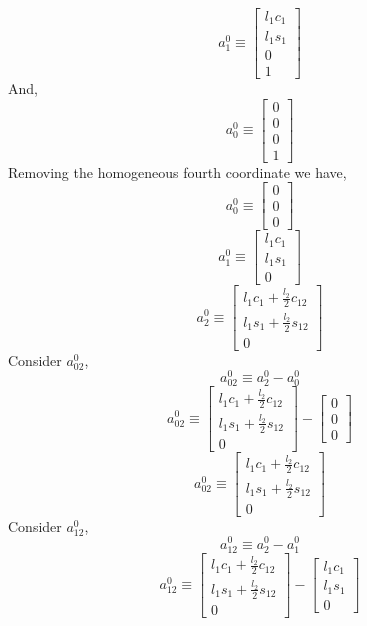 \documentclass[12pt]{article}
\begin{document}
\[
  a_1^0 \equiv
  \begin{bmatrix}
    l_1c_1\\
    l_1s_1\\
    0 \\
    1
  \end{bmatrix}
\]
And,
\[
  a_0^0 \equiv \begin{bmatrix} 0 \\ 0 \\ 0 \\ 1 \end{bmatrix}
\]
Removing the homogeneous fourth coordinate we have,
\[
  a_0^0 \equiv
  \begin{bmatrix} 0 \\ 0 \\ 0  \end{bmatrix}
\]
\[
  a_1^0 \equiv
  \begin{bmatrix}
    l_1c_1\\
    l_1s_1\\
    0
  \end{bmatrix}
\]
\[
  a_2^0 \equiv
  \begin{bmatrix}
    l_1c_1 + \frac{l_2}{2}c_{12}\\
    l_1s_1 + \frac{l_2}{2}s_{12}\\
    0
  \end{bmatrix}
\]
Consider $a_{02}^0$,
\[
  a_{02}^0 \equiv a_2^0 - a_0^0
\]
\[
  a_{02}^0 \equiv
  \begin{bmatrix}
    l_1c_1 + \frac{l_2}{2}c_{12}\\
    l_1s_1 + \frac{l_2}{2}s_{12}\\
    0
  \end{bmatrix}
  -
  \begin{bmatrix} 0 \\ 0 \\ 0  \end{bmatrix}
\]
\[
  a_{02}^0 \equiv
  \begin{bmatrix}
    l_1c_1 + \frac{l_2}{2}c_{12}\\
    l_1s_1 + \frac{l_2}{2}s_{12}\\
    0
  \end{bmatrix}
\]
Consider $a_{12}^0$,
\[
  a_{12}^0 \equiv a_2^0 - a_1^0
\]
\[
  a_{12}^0 \equiv
  \begin{bmatrix}
    l_1c_1 + \frac{l_2}{2}c_{12}\\
    l_1s_1 + \frac{l_2}{2}s_{12}\\
    0
  \end{bmatrix}
  -
  \begin{bmatrix}
    l_1c_1\\
    l_1s_1\\
    0
  \end{bmatrix}
\]
\end{document}
